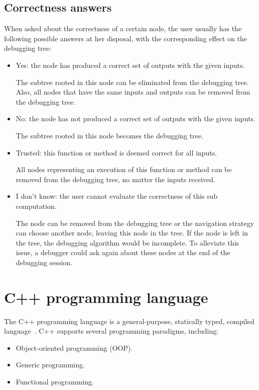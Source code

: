 \subsection{Correctness answers}
When asked about the correctness of a certain node, the user usually has the following possible answers at her disposal, with the corresponding effect on the debugging tree:
\begin{itemize}
    \item Yes: the node has produced a correct set of outputs with the given inputs.
    
    The subtree rooted in this node can be eliminated from the debugging tree.
    Also, all nodes that have the same inputs and outputs can be removed from the debugging tree.
    \item No: the node has not produced a correct set of outputs with the given inputs.
    
    The subtree rooted in this node becomes the debugging tree.
    \item Trusted: this function or method is deemed correct for all inputs.
    
    All nodes representing an execution of this function or method can be removed from the debugging tree, no matter the inputs received.
    \item I don't know: the user cannot evaluate the correctness of this sub computation. 
    
    The node can be removed from the debugging tree or the navigation strategy can choose another node, leaving this node in the tree. If the node is left in the tree, the debugging algorithm would be incomplete. To alleviate this issue, a debugger could ask again about these nodes at the end of the debugging session.
\end{itemize}

\section{C++ programming language}

The C++ programming language is a general-purpose, statically typed, compiled language~\cite{cppHistory}.
%
C++ supports several programming paradigms, including:

\begin{itemize}
    \item Object-oriented programming (OOP).
    \item Generic programming.
    \item Functional programming.
\end{itemize}

